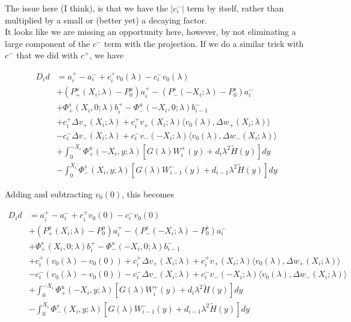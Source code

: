 \documentclass[12pt]{article}
\begin{document}
\begin{enumerate}
The issue here (I think), is that we have the $|c_i^-|$ term by itself, rather than multiplied by a small or (better yet) a decaying factor.\\

It looks like we are missing an opportunity here, however, by not eliminating a large component of the $c^-$ term with the projection. If we do a similar trick with $c^-$ that we did with $c^+$, we have

\begin{align*}
D_i d &= a_i^+ - a_i^- + c_i^+ v_0(\lambda) - c_i^- v_0(\lambda) \\
&+ (P^u_+(X_i; \lambda) - P_0^u)a_i^+ - (P^s_-(-X_i; \lambda) - P_0^s)a_i^- \\
&+ \Phi^s_+(X_i, 0; \lambda)b_i^+ - \Phi^u_-(-X_i, 0; \lambda)b_{i-1}^- \\
&+ c_i^+ \Delta v_+(X_i; \lambda) + c_i^+ v_+(X_i; \lambda) \langle v_0(\lambda), \Delta w_+(X_i; \lambda) \rangle \\
&- c_i^- \Delta v_-(X_i; \lambda) + c_i^- v_-(-X_i; \lambda) \langle v_0(\lambda), \Delta w_-(X_i; \lambda) \rangle \\
&+ \int_0^{-X_i} \Phi^u_+(-X_i, y; \lambda) [ G(\lambda)W_i^+(y) + d_i \lambda^2 \tilde{H}(y) ] dy \\
&- \int_0^{X_i} \Phi^s_-(X_i, y; \lambda) [ G(\lambda)W_{i-1}^-(y) + d_{i-1} \lambda^2 \tilde{H}(y) ] dy
\end{align*}

Adding and subtracting $v_0(0)$, this becomes

\begin{align*}
D_i d &= a_i^+ - a_i^- + c_i^+ v_0(0) - c_i^- v_0(0) \\
&+ (P^u_+(X_i; \lambda) - P_0^u)a_i^+ - (P^s_-(-X_i; \lambda) - P_0^s)a_i^- \\
&+ \Phi^s_+(X_i, 0; \lambda)b_i^+ - \Phi^u_-(-X_i, 0; \lambda)b_{i-1}^- \\
&+ c_i^+(v_0(\lambda) - v_0(0)) + c_i^+ \Delta v_+(X_i; \lambda) + c_i^+ v_+(X_i; \lambda) \langle v_0(\lambda), \Delta w_+(X_i; \lambda) \rangle \\
&- c_i^-(v_0(\lambda) - v_0(0)) - c_i^- \Delta v_-(X_i; \lambda) + c_i^- v_-(-X_i; \lambda) \langle v_0(\lambda), \Delta w_-(X_i; \lambda) \rangle \\
&+ \int_0^{-X_i} \Phi^u_+(-X_i, y; \lambda) [ G(\lambda)W_i^+(y) + d_i \lambda^2 \tilde{H}(y) ] dy \\
&- \int_0^{X_i} \Phi^s_-(X_i, y; \lambda) [ G(\lambda)W_{i-1}^-(y) + d_{i-1} \lambda^2 \tilde{H}(y) ] dy
\end{align*}


\end{enumerate}
\end{document}
